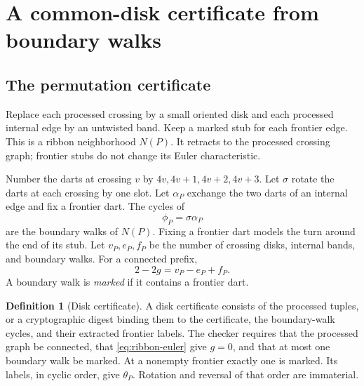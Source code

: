 \documentclass[11pt]{article}
\theoremstyle{definition}\newtheorem{definition}[theorem]{Definition}
\theoremstyle{remark}\newtheorem{remark}[theorem]{Remark}
\begin{document}
\section{A common-disk certificate from boundary walks}
\label{sec:disk}
\subsection{The permutation certificate}
Replace each processed crossing by a small oriented disk and each processed
internal edge by an untwisted band. Keep a marked stub for each frontier edge.
This is a ribbon neighborhood $N(P)$. It retracts to the processed crossing graph;
frontier stubs do not change its Euler characteristic.

Number the darts at crossing $v$ by $4v,4v+1,4v+2,4v+3$. Let $\sigma$ rotate
the darts at each crossing by one slot. Let $\alpha_P$ exchange the two darts of
an internal edge and fix a frontier dart. The cycles of
\begin{equation}\label{eq:boundary-permutation}
 \phi_P=\sigma\alpha_P
\end{equation}
are the boundary walks of $N(P)$. Fixing a frontier dart models the turn around
the end of its stub. Let $v_P,e_P,f_P$ be the number of crossing disks, internal
bands, and boundary walks. For a connected prefix,
\begin{equation}\label{eq:ribbon-euler}
 2-2g=v_P-e_P+f_P.
\end{equation}
A boundary walk is \emph{marked} if it contains a frontier dart.

\begin{definition}[Disk certificate]
A disk certificate consists of the processed tuples, or a cryptographic digest
binding them to the certificate, the boundary-walk cycles, and their extracted
frontier labels. The checker requires that the processed graph be connected,
that \eqref{eq:ribbon-euler} give $g=0$, and that at most one boundary walk be
marked. At a nonempty frontier exactly one is marked. Its labels, in cyclic
order, give $\theta_P$. Rotation and reversal of that order are immaterial.
\end{definition}
\end{document}
